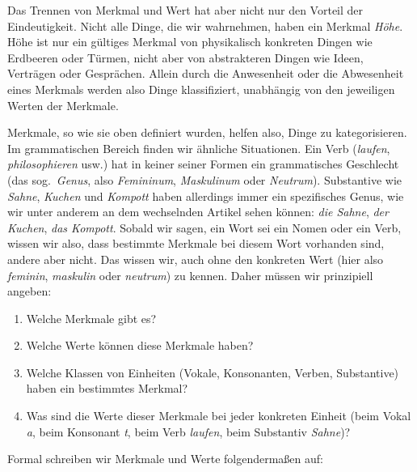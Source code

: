 Das Trennen von Merkmal und Wert hat aber nicht nur den Vorteil der Eindeutigkeit.
Nicht alle Dinge, die wir wahrnehmen, haben ein Merkmal \textit{Höhe}.
Höhe ist nur ein gültiges Merkmal von physikalisch konkreten Dingen wie Erdbeeren oder Türmen, nicht aber von abstrakteren Dingen wie Ideen, Verträgen oder Gesprächen.
Allein durch die Anwesenheit oder die Abwesenheit eines Merkmals werden also Dinge klassifiziert, unabhängig von den jeweiligen Werten der Merkmale.


Merkmale, so wie sie oben definiert wurden, helfen also, Dinge zu kategorisieren.
Im grammatischen Bereich finden wir ähnliche Situationen.
Ein Verb (\textit{laufen}, \textit{philosophieren} usw.) hat in keiner seiner Formen ein grammatisches Geschlecht (das sog.\ \textit{Genus}, also \textit{Femininum}, \textit{Maskulinum} oder \textit{Neutrum}).
Substantive wie \textit{Sahne}, \textit{Kuchen} und \textit{Kompott} haben allerdings immer ein spezifisches Genus, wie wir unter anderem an dem wechselnden Artikel sehen können: \textit{die Sahne}, \textit{der Kuchen}, \textit{das Kompott}.
Sobald wir sagen, ein Wort sei ein Nomen oder ein Verb, wissen wir also, dass bestimmte Merkmale bei diesem Wort vorhanden sind, andere aber nicht.
Das wissen wir, auch ohne den konkreten Wert (hier also \textit{feminin}, \textit{maskulin} oder \textit{neutrum}) zu kennen.
Daher müssen wir prinzipiell angeben:

\begin{enumerate}\Lf
  \item Welche Merkmale gibt es?
  \item Welche Werte können diese Merkmale haben?
  \item Welche Klassen von Einheiten (\zB Vokale, Konsonanten, Verben, Substantive) haben ein bestimmtes Merkmal?
  \item Was sind die Werte dieser Merkmale bei jeder konkreten Einheit (beim Vokal \textit{a}, beim Konsonant \textit{t}, beim Verb \textit{laufen}, beim Substantiv \textit{Sahne})?
\end{enumerate}


Formal schreiben wir Merkmale und Werte folgendermaßen auf:


